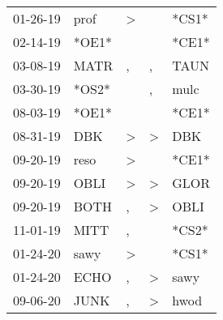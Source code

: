 \begin{supertabular}{lllll}
 01-26-19 &   prof &     \textgreater &                  &  *CS1* \\
 02-14-19 &  *OE1* &                  &                  &  *CE1* \\
 03-08-19 &   MATR &                , &                , &   TAUN \\
 03-30-19 &  *OS2* &                  &                , &   mulc \\
 08-03-19 &  *OE1* &                  &                  &  *CE1* \\
 08-31-19 &    DBK &     \textgreater &     \textgreater &    DBK \\
 09-20-19 &   reso &     \textgreater &                  &  *CE1* \\
 09-20-19 &   OBLI &     \textgreater &     \textgreater &   GLOR \\
 09-20-19 &   BOTH &                , &     \textgreater &   OBLI \\
 11-01-19 &   MITT &                , &                  &  *CS2* \\
 01-24-20 &   sawy &     \textgreater &                  &  *CS1* \\
 01-24-20 &   ECHO &                , &     \textgreater &   sawy \\
 09-06-20 &   JUNK &                , &     \textgreater &   hwod \\
\end{supertabular}
